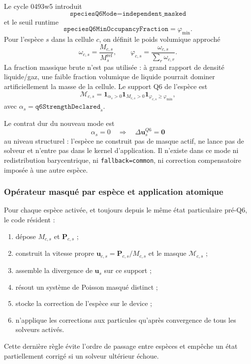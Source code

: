 \documentclass[11pt,a4paper]{article}
\begin{document}
Le cycle 0493w5 introduit
\begin{equation}
  \texttt{speciesQ6Mode=independent\_masked}
\end{equation}
et le seuil runtime
\begin{equation}
  \texttt{speciesQ6MinOccupancyFraction}=\varphi_{\min}.
\end{equation}
Pour l'espèce $s$ dans la cellule $c$, on définit le poids volumique approché
\begin{equation}
  \omega_{c,s}=\frac{M_{c,s}}{M_s^{\mathrm{ref}}},
  \qquad
  \varphi_{c,s}=\frac{\omega_{c,s}}{\sum_r\omega_{c,r}}.
\end{equation}
La fraction massique brute n'est pas utilisée : à grand rapport de densité liquide/gaz, une faible fraction volumique de liquide pourrait dominer artificiellement la masse de la cellule. Le support Q6 de l'espèce est
\begin{equation}
  \mathcal M_{c,s}
  =\mathbf 1_{\alpha_s>0}
   \mathbf 1_{M_{c,s}>0}
   \mathbf 1_{\varphi_{c,s}\geq\varphi_{\min}},
\end{equation}
avec $\alpha_s=\texttt{q6StrengthDeclared}_s$.

Le contrat dur du nouveau mode est
\begin{equation}
  \alpha_s=0
  \quad\Longrightarrow\quad
  \Delta\bm u^{Q6}_s=\bm 0
\end{equation}
au niveau structurel : l'espèce ne construit pas de masque actif, ne lance pas de solveur et n'entre pas dans le kernel d'application. Il n'existe dans ce mode ni redistribution barycentrique, ni \texttt{fallback=common}, ni correction compensatoire imposée à une autre espèce.

\subsubsection{Opérateur masqué par espèce et application atomique}

Pour chaque espèce activée, et toujours depuis le même état particulaire pré-Q6, le code résident :
\begin{enumerate}[nosep]
  \item dépose $M_{c,s}$ et $\bm P_{c,s}$ ;
  \item construit la vitesse propre $\bm u_{c,s}=\bm P_{c,s}/M_{c,s}$ et le masque $\mathcal M_{c,s}$ ;
  \item assemble la divergence de $\bm u_s$ sur ce support ;
  \item résout un système de Poisson masqué distinct ;
  \item stocke la correction de l'espèce sur le device ;
  \item n'applique les corrections aux particules qu'après convergence de tous les solveurs activés.
\end{enumerate}
Cette dernière règle évite l'ordre de passage entre espèces et empêche un état partiellement corrigé si un solveur ultérieur échoue.
\end{document}
